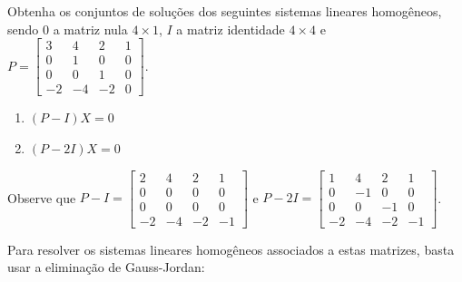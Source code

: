 \documentclass[12pt,a4paper]{article}
\begin{document}
\begin{ExerciseList}
\Exercise[title={1,8}] Obtenha os conjuntos de soluções dos seguintes sistemas lineares homogêneos, sendo $0$ a matriz nula $4 \times 1$, $I$ a matriz identidade $4 \times 4$ e $P = \begin{bmatrix}
 3 &  4 &  2 & 1\\
 0 &  1 &  0 & 0\\
 0 &  0 &  1 & 0\\
-2 & -4 & -2 & 0
\end{bmatrix}$.
\begin{multicols}{2}
\begin{enumerate}
\item $(P - I)X = 0$
\item $(P - 2I)X = 0$
\end{enumerate}
\end{multicols}
\Answer Observe que $P - I = \begin{bmatrix}
 2 &  4 &  2 & 1\\
 0 &  0 &  0 & 0\\
 0 &  0 &  0 & 0\\
-2 & -4 & -2 & -1
\end{bmatrix}$ e $P - 2I = \begin{bmatrix}
 1 &  4 &  2 & 1\\
 0 & -1 &  0 & 0\\
 0 &  0 & -1 & 0\\
-2 & -4 & -2 & -1
\end{bmatrix}$.

Para resolver os sistemas lineares homogêneos associados a estas matrizes, basta usar a eliminação de Gauss-Jordan:
\begin{enumerate}


\end{enumerate}
\end{ExerciseList}
\end{document}
